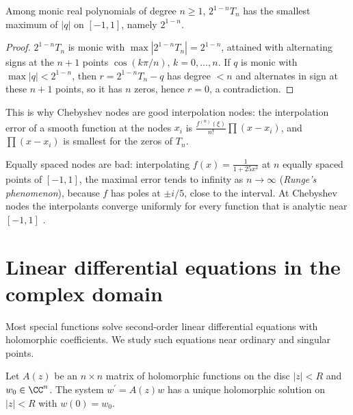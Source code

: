 \begin{proposition}[Chebyshev]\label{special-functions:proposition-chebyshev-minimal}
Among monic real polynomials of degree $n \geq 1$, $2^{1-n}T_n$ has the smallest maximum of $|q|$ on $[-1, 1]$, namely $2^{1-n}$.
\end{proposition}

\begin{proof}
$2^{1-n}T_n$ is monic with $\max|2^{1-n}T_n| = 2^{1-n}$, attained with alternating signs at the $n + 1$ points $\cos(k\pi/n)$, $k = 0, \ldots, n$. If $q$ is monic with $\max|q| < 2^{1-n}$, then $r = 2^{1-n}T_n - q$
has degree $< n$ and alternates in sign at these $n + 1$ points, so it has $n$ zeros, hence $r = 0$, a contradiction.
\end{proof}

This is why Chebyshev nodes are good interpolation nodes: the interpolation error of a smooth function at the nodes $x_i$ is $\frac{f^{(n)}(\xi)}{n!}\prod(x - x_i)$, and $\prod(x - x_i)$ is smallest for the zeros of $T_n$.

\begin{counterexample}\label{special-functions:counterexample-runge}
Equally spaced nodes are bad: interpolating $f(x) = \frac{1}{1 + 25x^2}$ at $n$ equally spaced points of $[-1, 1]$, the maximal error tends to infinity as $n \to \infty$ (\emph{Runge's phenomenon}), because $f$ has poles at
$\pm i/5$, close to the interval. At Chebyshev nodes the interpolants converge uniformly for every function that is analytic near $[-1, 1]$ \cite{trefethen-approximation}.
\end{counterexample}

\section{Linear differential equations in the complex domain}\label{special-functions:section-fuchsian}

Most special functions solve second-order linear differential equations with holomorphic coefficients. We study such equations near ordinary and singular points.

\begin{theorem}\label{special-functions:theorem-holomorphic-solutions}
Let $A(z)$ be an $n \times n$ matrix of holomorphic functions on the disc $|z| < R$ and $w_0 \in \CC^n$. The system $w^{\prime} = A(z)w$ has a unique holomorphic solution on $|z| < R$ with $w(0) = w_0$.
\end{theorem}

